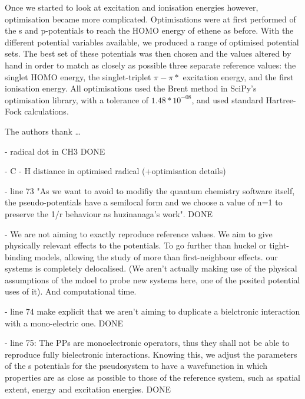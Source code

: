 \documentclass[journal=jctcce,manuscript=article]{achemso}
\begin{document}
Once we started to look at excitation and ionisation energies however, optimisation became more complicated. Optimisations were at first performed of the s and p-potentials to reach the HOMO energy of ethene as before. With the different potential variables available, we produced a range of optimised potential sets. The best set of these potentials was then chosen and the values altered by hand in order to match as closely as possible three separate reference values: the singlet HOMO energy, the singlet-triplet \(\pi-\pi*\) excitation energy, and the first ionisation energy. All optimisations used the Brent method in SciPy's optimisation library, with a tolerance of \(1.48*10^{-08}\), and used standard Hartree-Fock calculations.\cite{scipy}

\begin{acknowledgement}

The authors thank \ldots

\end{acknowledgement}

- radical dot in CH3 DONE

- C - H distiance in optimised radical (+optimisation details)

- line 73 "As we want to avoid to modifiy the quantum chemistry software itself, the pseudo-potentials have a semilocal form and we choose a value of n=1 to preserve the 1/r behaviour as huzinanaga's work". DONE

- We are not aiming to exactly reproduce reference values. We aim to give physically relevant effects to the potentials. To go further than huckel or tight-binding models, allowing the study of more than first-neighbour effects. our systems is completely delocalised. (We aren't actually making use of the physical assumptions of the mdoel to probe new systems here, one of the posited potential uses of it). And computational time.

- line 74 make explicit that we aren't aiming to duplicate a bielctronic interaction with a mono-electric one. DONE

- line 75: The PPs are monoelectronic operators, thus they shall not be able to reproduce fully bielectronic interactions. Knowing this, we adjust the parameters of the s potentials for the pseudosystem to have a wavefunction in which properties are as close as possible to those of the reference system, such as spatial extent, energy and excitation energies. DONE
\end{document}
